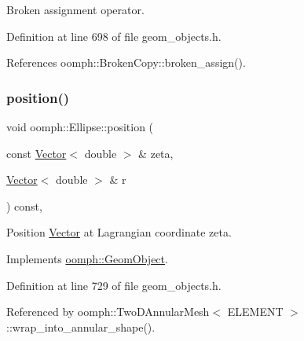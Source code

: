 Broken assignment operator. 



Definition at line 698 of file geom\+\_\+objects.\+h.



References oomph\+::\+Broken\+Copy\+::broken\+\_\+assign().

\mbox{\label{classoomph_1_1Ellipse_abf6972409206084dd1f517a535fb1b52}} 
\subsubsection{\texorpdfstring{position()}{position()}\hspace{0.1cm}{\footnotesize\ttfamily [1/2]}}
{\footnotesize\ttfamily void oomph\+::\+Ellipse\+::position (\begin{DoxyParamCaption}\item[{const \hyperlink{classoomph_1_1Vector}{Vector}$<$ double $>$ \&}]{zeta,  }\item[{\hyperlink{classoomph_1_1Vector}{Vector}$<$ double $>$ \&}]{r }\end{DoxyParamCaption}) const\hspace{0.3cm}{\ttfamily [inline]}, {\ttfamily [virtual]}}



Position \hyperlink{classoomph_1_1Vector}{Vector} at Lagrangian coordinate zeta. 



Implements \hyperlink{classoomph_1_1GeomObject_a0d04c9d4667817f3ef24bb660fd56065}{oomph\+::\+Geom\+Object}.



Definition at line 729 of file geom\+\_\+objects.\+h.



Referenced by oomph\+::\+Two\+D\+Annular\+Mesh$<$ E\+L\+E\+M\+E\+N\+T $>$\+::wrap\+\_\+into\+\_\+annular\+\_\+shape().

\mbox{\label{classoomph_1_1Ellipse_a862ce1f7d6ac7b2c5deb613b49caa30f}} 
